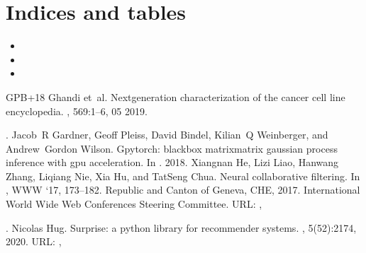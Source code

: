 \documentclass[letterpaper,10pt,english,openany,oneside]{sphinxmanual}
\begin{document}
\chapter{Indices and tables}
\label{\detokenize{index:indices-and-tables}}\begin{itemize}
\item {} 

\item {} 

\item {} 

\end{itemize}

\begin{sphinxthebibliography}{GPB+18}
Ghandi et al. Next\sphinxhyphen{}generation characterization of the cancer cell line encyclopedia. , 569:1–6, 05 2019. %
\begin{footnote}[8]\sphinxAtStartFootnote
{}
%
\end{footnote}.
Jacob R Gardner, Geoff Pleiss, David Bindel, Kilian Q Weinberger, and Andrew Gordon Wilson. Gpytorch: blackbox matrix\sphinxhyphen{}matrix gaussian process inference with gpu acceleration. In . 2018.
Xiangnan He, Lizi Liao, Hanwang Zhang, Liqiang Nie, Xia Hu, and Tat\sphinxhyphen{}Seng Chua. Neural collaborative filtering. In , WWW ‘17, 173–182. Republic and Canton of Geneva, CHE, 2017. International World Wide Web Conferences Steering Committee. URL: , %
\begin{footnote}[9]\sphinxAtStartFootnote
{}
%
\end{footnote}.
Nicolas Hug. Surprise: a python library for recommender systems. , 5(52):2174, 2020. URL: , %

\end{sphinxthebibliography}
\end{document}
